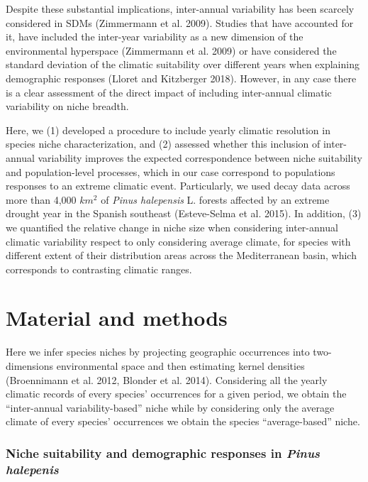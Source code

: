 \documentclass[11pt,twoside]{reedthesis}
\begin{document}
Despite these substantial implications, inter-annual variability has
been scarcely considered in SDMs (Zimmermann et al. 2009). Studies that
have accounted for it, have included the inter-year variability as a new
dimension of the environmental hyperspace (Zimmermann et al. 2009) or
have considered the standard deviation of the climatic suitability over
different years when explaining demographic responses (Lloret and
Kitzberger 2018). However, in any case there is a clear assessment of
the direct impact of including inter-annual climatic variability on
niche breadth.\par

Here, we (1) developed a procedure to include yearly climatic resolution
in species niche characterization, and (2) assessed whether this
inclusion of inter-annual variability improves the expected
correspondence between niche suitability and population-level processes,
which in our case correspond to populations responses to an extreme
climatic event. Particularly, we used decay data across more than 4,000
\(km^2\) of \emph{Pinus halepensis} L. forests affected by an extreme
drought year in the Spanish southeast (Esteve-Selma et al. 2015). In
addition, (3) we quantified the relative change in niche size when
considering inter-annual climatic variability respect to only
considering average climate, for species with different extent of their
distribution areas across the Mediterranean basin, which corresponds to
contrasting climatic ranges.\par

\section{Material and methods}\label{material-and-methods-1}

Here we infer species niches by projecting geographic occurrences into
two-dimensions environmental space and then estimating kernel densities
(Broennimann et al. 2012, Blonder et al. 2014). Considering all the
yearly climatic records of every species' occurrences for a given
period, we obtain the ``inter-annual variability-based'' niche while by
considering only the average climate of every species' occurrences we
obtain the species ``average-based'' niche.\par

\subsubsection{\texorpdfstring{Niche suitability and demographic
responses in \emph{Pinus
halepenis}}{Niche suitability and demographic responses in Pinus halepenis}}\label{niche-suitability-and-demographic-responses-in-pinus-halepenis}
\end{document}
